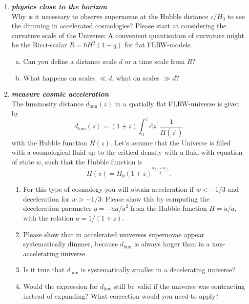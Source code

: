 \documentclass[a4paper,12pt]{article}
\newcommand{\question}[1]{\textbf{\textit{#1}}}
\begin{document}
\begin{enumerate}
\item \question{physics close to the horizon}\\
Why is it necessary to observe supernovae at the Hubble distance $c/H_0$ to see the dimming in accelerated cosmologies? Please start at considering the curvature scale of the Universe: A convenient quantisation of curvature might be the Ricci-scalar $R = 6H^2(1-q)$ for flat FLRW-models.
\begin{enumerate}[(a)]
\item{Can you define a distance scale $d$ or a time scale from $R$?}
\item{What happens on scales $\ll d$, what on scales $\gg d$?}
\end{enumerate}


\item \question{measure cosmic acceleration}\\
The luminosity distance $d_\mathrm{lum}(z)$ in a spatially flat FLRW-universe is given by
\begin{equation}
d_\mathrm{lum}(z) = (1+z)\int_0^z\mathrm{d}z^\prime\:\frac{1}{H(z^\prime)}
\end{equation}
with the Hubble function $H(z)$. Let's assume that the Universe is filled with a cosmological fluid up to the critical density with a fluid with equation of state $w$, such that the Hubble function is
\begin{equation}
H(z) = H_0 (1+z)^\frac{3(1+w)}{2}.
\end{equation}
\begin{enumerate}
\item{For this type of cosmology you will obtain acceleration if $w<-1/3$ and deceleration for $w>-1/3$: Please show this by computing the deceleration parameter $q=-\ddot{a}a/\dot{a}^2$ from the Hubble-function $H=\dot{a}/a$, with the relation $a=1/(1+z)$.}
\item{Please show that in accelerated universes supernovae appear systematically dimmer, because $d_\mathrm{lum}$ is always larger than in a non-accelerating universe.}
\item{Is it true that $d_\mathrm{lum}$ is systematically smaller in a decelerating universe?}
\item{Would the expression for $d_\mathrm{lum}$ still be valid if the universe was contracting instead of expanding? What correction would you need to apply?}
\end{enumerate}

\end{enumerate}
\end{document}
